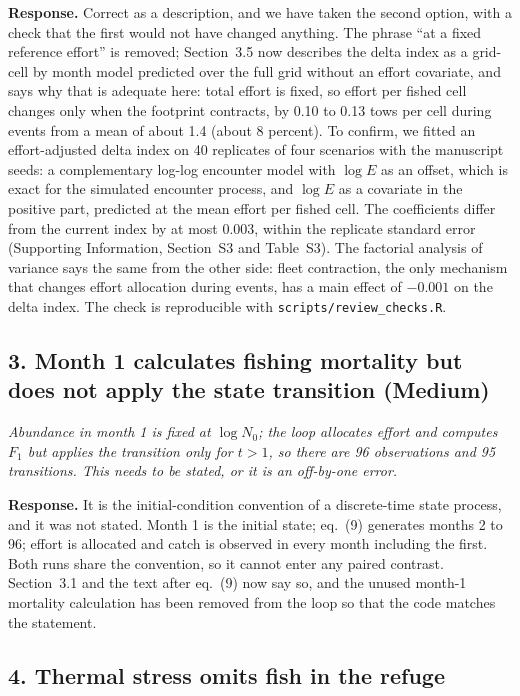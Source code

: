 \documentclass[11pt,a4paper]{article}
\newcommand{\rev}[1]{\par\medskip\noindent\textit{\color{black!60}#1}\par\smallskip}
\newcommand{\resp}{\noindent\textbf{Response.} }
\begin{document}
\resp Correct as a description, and we have taken the second option, with a check that the first would not have changed anything. The phrase ``at a fixed reference effort'' is removed; Section~3.5 now describes the delta index as a grid-cell by month model predicted over the full grid without an effort covariate, and says why that is adequate here: total effort is fixed, so effort per fished cell changes only when the footprint contracts, by 0.10 to 0.13 tows per cell during events from a mean of about 1.4 (about 8 percent). To confirm, we fitted an effort-adjusted delta index on 40 replicates of four scenarios with the manuscript seeds: a complementary log-log encounter model with $\log E$ as an offset, which is exact for the simulated encounter process, and $\log E$ as a covariate in the positive part, predicted at the mean effort per fished cell. The coefficients differ from the current index by at most 0.003, within the replicate standard error (Supporting Information, Section~S3 and Table~S3). The factorial analysis of variance says the same from the other side: fleet contraction, the only mechanism that changes effort allocation during events, has a main effect of $-0.001$ on the delta index. The check is reproducible with \texttt{scripts/review\_checks.R}.

\subsection*{3. Month 1 calculates fishing mortality but does not apply the state transition (Medium)}

\rev{Abundance in month 1 is fixed at $\log N_0$; the loop allocates effort and computes $F_1$ but applies the transition only for $t>1$, so there are 96 observations and 95 transitions. This needs to be stated, or it is an off-by-one error.}

\resp It is the initial-condition convention of a discrete-time state process, and it was not stated. Month 1 is the initial state; eq.~(9) generates months 2 to 96; effort is allocated and catch is observed in every month including the first. Both runs share the convention, so it cannot enter any paired contrast. Section~3.1 and the text after eq.~(9) now say so, and the unused month-1 mortality calculation has been removed from the loop so that the code matches the statement.

\subsection*{4. Thermal stress omits fish in the refuge}
\end{document}
